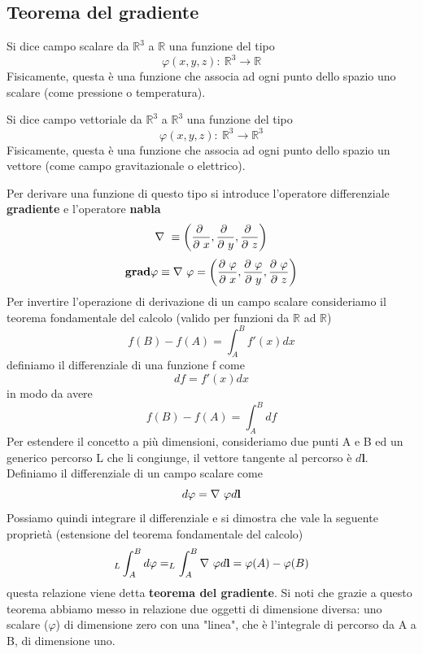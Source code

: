\documentclass[
10pt, %
a4paper, %
oneside, %
headinclude,footinclude, %
BCOR5mm, %
]{scrartcl}
\begin{document}
\subsection{Teorema del gradiente}
\begin{definizione}
	Si dice campo scalare da \(\mathbb{R}^3\) a \(\mathbb{R}\) una funzione del tipo 
	\[\varphi(x, y, z):\ \mathbb{R}^3\rightarrow \mathbb{R}\]
	Fisicamente, questa è una funzione che associa ad ogni punto dello spazio uno scalare (come pressione o temperatura).
\end{definizione}
\begin{definizione}
	Si dice campo vettoriale da \(\mathbb{R}^3\) a \(\mathbb{R}^3\) una funzione del tipo 
	\[\varphi(x, y, z):\ \mathbb{R}^3\rightarrow \mathbb{R}^3\]
	Fisicamente, questa è una funzione che associa ad ogni punto dello spazio un vettore (come campo gravitazionale o elettrico).
\end{definizione}
Per derivare una funzione di questo tipo si introduce l'operatore differenziale \textbf{gradiente} e l'operatore \textbf{nabla}
\[\mathbf{\nabla\ } \equiv \left(\frac{\partial\ }{\partial\  x}, \frac{\partial\  }{\partial\  y}, \frac{\partial\  }{\partial\  z}\right)\]
\[\mathbf{grad}\varphi \equiv \mathbf{\nabla\ }\varphi = \left(\frac{\partial\ \varphi }{\partial\  x}, \frac{\partial\ \varphi }{\partial\  y}, \frac{\partial\ \varphi }{\partial\  z}\right)\]
Per invertire l'operazione di derivazione di un campo scalare consideriamo il teorema fondamentale del calcolo (valido per funzioni da \(\mathbb{R}\) ad \(\mathbb{R}\))
\[f(B)-f(A) = \int_{A}^{B}f'(x)dx\]
definiamo il differenziale di una funzione f come
\[df = f'(x)dx\] 
in modo da avere
\[f(B)-f(A) = \int_{A}^{B}df\]
Per estendere il concetto a più dimensioni, consideriamo due punti A e B ed un generico percorso L che li congiunge, il vettore tangente al percorso è $d\mathbf{l}$.  Definiamo il differenziale di un campo scalare come 
\[d\varphi = \mathbf{\nabla\ }\varphi d\mathbf{l}\]
Possiamo quindi integrare il differenziale e si dimostra che vale la seguente proprietà (estensione del teorema fondamentale del calcolo)
\[_L\int_{A}^{B}d\varphi = _L\int_{A}^{B}\mathbf{\nabla\ }\varphi d\mathbf{l} = \varphi(A)-\varphi(B)\]
questa relazione viene detta \textbf{teorema del gradiente}. Si noti che grazie a questo teorema abbiamo messo in relazione due oggetti di dimensione diversa: uno scalare (\(\varphi\)) di dimensione zero con una "linea", che è l'integrale di percorso da A a B, di dimensione uno.
\end{document}
